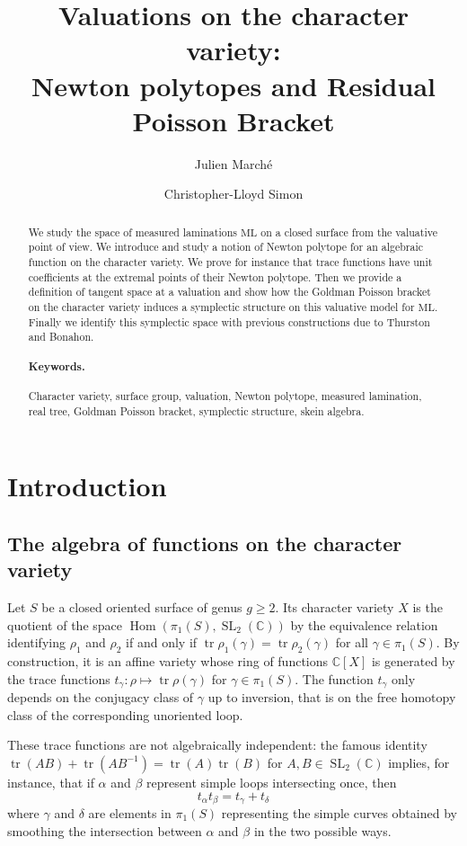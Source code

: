 \documentclass{amsart}
\title{Valuations on the character variety: \\ Newton polytopes and Residual Poisson Bracket}
\author{Julien March\'e}
\author{Christopher-Lloyd Simon}
\date{}
\newcommand{\C}{\mathbb{C}}
\newcommand{\ML}{\mathrm{ML}}
\DeclareMathOperator{\Hom}{Hom}
\DeclareMathOperator{\SL}{SL}
\DeclareMathOperator{\tr}{tr}
\begin{document}
\maketitle

\begin{abstract}
We study the space of measured laminations $\ML$ on a closed surface from the valuative point of view.
%
We introduce and study a notion of Newton polytope for an algebraic function on the character variety. We prove for instance that trace functions have unit coefficients at the extremal points of their Newton polytope.
%
Then we provide a definition of tangent space at a valuation and show how the Goldman Poisson bracket on the character variety induces a symplectic structure on this valuative model for $\ML$. Finally we identify this symplectic space with previous constructions due to Thurston and Bonahon.

\paragraph{Keywords.} Character variety, surface group, valuation, Newton polytope, measured lamination, real tree, Goldman Poisson bracket, symplectic structure, skein algebra.
\end{abstract}


\section*{Introduction}

\subsection*{The algebra of functions on the character variety}

Let $S$  be a closed oriented surface of genus $g\ge 2$. Its character variety $X$ is the quotient of the space $\Hom(\pi_1(S),\SL_2(\C))$ by the equivalence relation identifying $\rho_1$ and $\rho_2$ if and only if $\tr \rho_1(\gamma)=\tr \rho_2(\gamma)$ for all $\gamma\in \pi_1(S)$. 
%
By construction, it is an affine variety whose ring of functions $\C[X]$ is generated by the trace functions $t_\gamma \colon \rho \mapsto \tr \rho(\gamma)$ for $\gamma\in \pi_1(S)$.
%
The function $t_\gamma$ only depends on the conjugacy class of $\gamma$ up to inversion, that is on the free homotopy class of the corresponding unoriented loop.

These trace functions are not algebraically independent: %
the famous identity $\tr(AB)+\tr(AB^{-1})=\tr(A)\tr(B)$ for $A,B\in \SL_2(\C)$ implies, for instance, that if $\alpha$ and $\beta$ represent simple loops intersecting once, then $$t_\alpha t_\beta=t_\gamma+t_\delta$$ where $\gamma$ and $\delta$ are elements in $\pi_1(S)$ representing the simple curves obtained by smoothing the intersection between $\alpha$ and $\beta$ in the two possible ways. 
\end{document}

